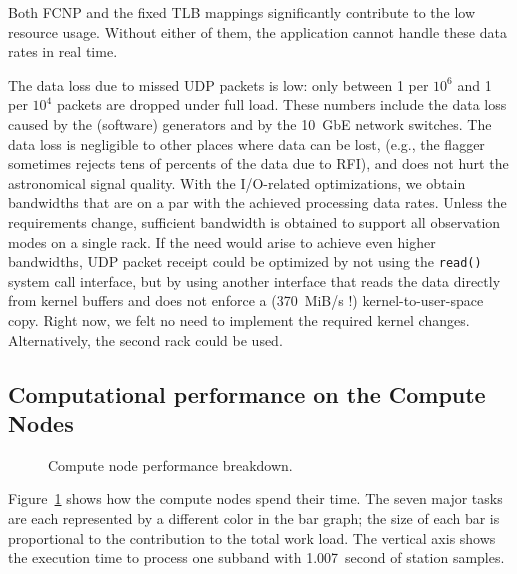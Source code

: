 \documentclass{sig-alternate}
\begin{document}
Both FCNP and the fixed TLB mappings significantly contribute to the low
resource usage.
Without either of them, the application cannot handle these data rates in
real time.

The data loss due to missed UDP packets is low: only between 1 per $10^6$ and
1 per $10^4$ packets are dropped under full load.
These numbers include the data loss caused by the (software) generators and by
the 10~GbE network switches.
The data loss is negligible to other places where data can be lost,
(e.g., the flagger sometimes rejects tens of percents of the data due to RFI),
and does not hurt the astronomical signal quality.
With the I/O-related optimizations, we obtain bandwidths that are on a par
with the achieved processing data rates.
Unless the requirements change, sufficient bandwidth is obtained to support
all observation modes on a single rack.
If the need would arise to achieve even higher bandwidths, UDP packet receipt
could be optimized by not using the \texttt{read()} system call interface,
but by using another interface that reads the data directly from kernel buffers
and does not enforce a (370~MiB/s !) kernel-to-user-space copy.
Right now, we felt no need to implement the required kernel changes.
Alternatively, the second rack could be used.


\subsection{Computational performance on the Compute Nodes}

\begin{figure}[ht]
\hfill
\caption{Compute node performance breakdown.}
\label{fig:cn-performance}
\end{figure}

Figure~\ref{fig:cn-performance} shows how the compute nodes spend their time.
The seven major tasks are each represented by a different color in the bar
graph; the size of each bar is proportional to the contribution to the total
work load.
The vertical axis shows the execution time to process one subband with
1.007~second of station samples.
\end{document}
